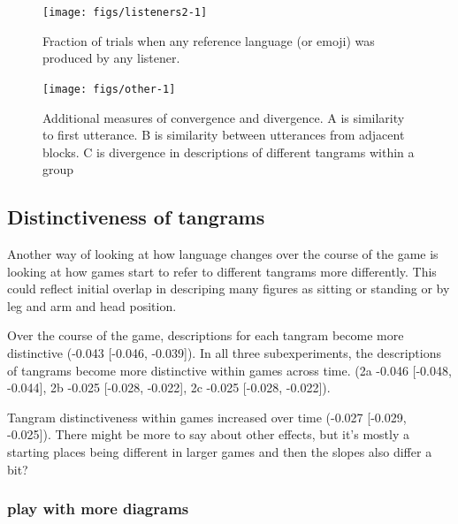 \documentclass[
  english,
  a4paper,
]{article}
\begin{document}
\begin{figure}[t!]

{\centering \texttt{[image: figs/listeners2-1]} 

}

\caption{Fraction of trials when any reference language (or emoji) was produced by any listener.}\label{fig:listeners2}
\end{figure}

\begin{figure}[t!]

{\centering \texttt{[image: figs/other-1]} 

}

\caption{Additional measures of convergence and divergence. A is similarity to first utterance. B is similarity between utterances from adjacent blocks. C is divergence in descriptions of different tangrams within a group}\label{fig:other}
\end{figure}

\hypertarget{distinctiveness-of-tangrams}{%
\subsection{Distinctiveness of tangrams}\label{distinctiveness-of-tangrams}}

Another way of looking at how language changes over the course of the game is looking at how games start to refer to different tangrams more differently. This could reflect initial overlap in descriping many figures as sitting or standing or by leg and arm and head position.

Over the course of the game, descriptions for each tangram become more distinctive (-0.043 {[}-0.046, -0.039{]}).
In all three subexperiments, the descriptions of tangrams become more distinctive within games across time. (2a -0.046 {[}-0.048, -0.044{]}, 2b -0.025 {[}-0.028, -0.022{]}, 2c -0.025 {[}-0.028, -0.022{]}).

Tangram distinctiveness within games increased over time (-0.027 {[}-0.029, -0.025{]}). There might be more to say about other effects, but it's mostly a starting places being different in larger games and then the slopes also differ a bit?

\hypertarget{play-with-more-diagrams}{%
\subsubsection{play with more diagrams}\label{play-with-more-diagrams}}
\end{document}

